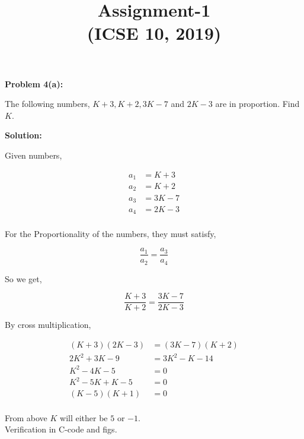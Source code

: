 \documentclass[11pt]{article}
\title{\LARGE{\textbf{Assignment-1}\\(ICSE 10, 2019)}}
\date{}
\begin{document}
\maketitle
\begin{multicols}{2}	

\begin{center}
    \textbf{\large Problem 4(a):}
\end{center}
\begin{flushleft}
The following numbers, $K + 3, K + 2, 3K - 7$ and $2K - 3$ are in proportion. Find $K$.\\[2\baselineskip]
\end{flushleft}
\begin{center}
    \textbf{\large Solution:}
\end{center}

\noindent Given numbers,

\begin{align*}
a_1 & = K + 3\\
a_2 & = K + 2\\
a_3 & = 3K - 7\\
a_4 & = 2K - 3\\
\end{align*}

\noindent For the Proportionality of the numbers, they must satisfy,

\[ \frac{a_1}{a_2} = \frac{a_3}{a_4} \]

\noindent So we get,

\[ \frac{K + 3}{K + 2} = \frac{3K - 7}{2K - 3} \]

\noindent By cross multiplication,

\begin{align*}
    (K + 3)(2K - 3) & = (3K - 7)(K + 2)\\
    2K^2 + 3K - 9 & = 3K^2 - K - 14\\
    K^2 - 4K - 5 & = 0\\
    K^2 - 5K + K - 5 & = 0\\
    (K - 5)(K + 1) & = 0\\
\end{align*}

\noindent From above $K$ will either be $5$ or $-1$.\\ [\baselineskip] 
Verification in C-code and figs.

\end{multicols}
\end{document}
